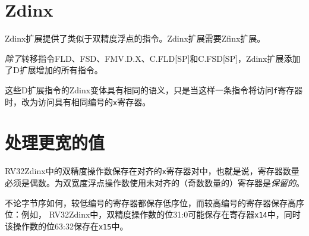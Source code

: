 \section{Zdinx}

Zdinx扩展提供了类似于双精度浮点的指令。Zdinx扩展需要Zfinx扩展。

{\em 除了}转移指令FLD、FSD、FMV.D.X、C.FLD[SP]和C.FSD[SP]，Zdinx扩展添加了D扩展增加的所有指令。

这些D扩展指令的Zdinx变体具有相同的语义，只是当这样一条指令将访问{\tt f}寄存器时，改为访问具有相同编号的{\tt x}寄存器。

\section{处理更宽的值}

RV32Zdinx中的双精度操作数保存在对齐的{\tt x}寄存器对中，也就是说，寄存器数量必须是偶数。为双宽度浮点操作数使用未对齐的（奇数数量的）寄存器是{\em 保留的}。

不论字节序如何，较低编号的寄存器都保存低序位，而较高编号的寄存器保存高序位：例如，
RV32Zdinx中，双精度操作数的位31:0可能保存在寄存器{\tt x14}中，同时该操作数的位63:32保存在{\tt x15}中。

